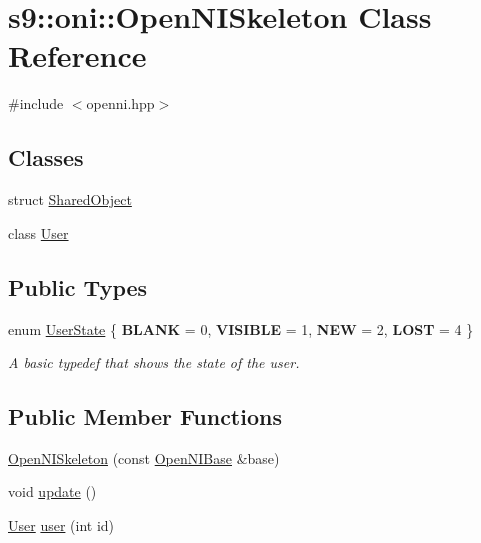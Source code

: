 \hypertarget{classs9_1_1oni_1_1OpenNISkeleton}{\section{s9\-:\-:oni\-:\-:Open\-N\-I\-Skeleton Class Reference}
\label{classs9_1_1oni_1_1OpenNISkeleton}
}


{\ttfamily \#include $<$openni.\-hpp$>$}

\subsection*{Classes}
\begin{DoxyCompactItemize}
\item 
struct \hyperlink{structs9_1_1oni_1_1OpenNISkeleton_1_1SharedObject}{Shared\-Object}
\item 
class \hyperlink{classs9_1_1oni_1_1OpenNISkeleton_1_1User}{User}
\end{DoxyCompactItemize}
\subsection*{Public Types}
\begin{DoxyCompactItemize}
\item 
enum \hyperlink{classs9_1_1oni_1_1OpenNISkeleton_a542f12d04d50a5cd8ec5484e1e75f16c}{User\-State} \{ {\bfseries B\-L\-A\-N\-K} = 0, 
{\bfseries V\-I\-S\-I\-B\-L\-E} = 1, 
{\bfseries N\-E\-W} = 2, 
{\bfseries L\-O\-S\-T} = 4
 \}
\begin{DoxyCompactList}\small\item\em A basic typedef that shows the state of the user. \end{DoxyCompactList}\end{DoxyCompactItemize}
\subsection*{Public Member Functions}
\begin{DoxyCompactItemize}
\item 
\hyperlink{classs9_1_1oni_1_1OpenNISkeleton_a24c6f7cccbc8d0c319e977f17bd2109c}{Open\-N\-I\-Skeleton} (const \hyperlink{classs9_1_1oni_1_1OpenNIBase}{Open\-N\-I\-Base} \&base)
\item 
void \hyperlink{classs9_1_1oni_1_1OpenNISkeleton_a785d6e82ac21748116fccec0967b6533}{update} ()
\item 
\hyperlink{classs9_1_1oni_1_1OpenNISkeleton_1_1User}{User} \hyperlink{classs9_1_1oni_1_1OpenNISkeleton_ae817361f4eda6a95d22abdaa382aa899}{user} (int id)
\end{DoxyCompactItemize}
